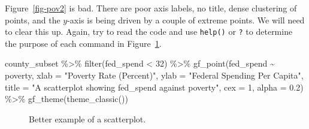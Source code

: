 \documentclass[
  letterpaper,
  DIV=11,
  numbers=noendperiod]{scrreprt}
\newenvironment{Shaded}{\begin{snugshade}}{\end{snugshade}}
\newcommand{\AttributeTok}[1]{\textcolor[rgb]{0.40,0.45,0.13}{#1}}
\newcommand{\DecValTok}[1]{\textcolor[rgb]{0.68,0.00,0.00}{#1}}
\newcommand{\FloatTok}[1]{\textcolor[rgb]{0.68,0.00,0.00}{#1}}
\newcommand{\FunctionTok}[1]{\textcolor[rgb]{0.28,0.35,0.67}{#1}}
\newcommand{\NormalTok}[1]{\textcolor[rgb]{0.00,0.23,0.31}{#1}}
\newcommand{\SpecialCharTok}[1]{\textcolor[rgb]{0.37,0.37,0.37}{#1}}
\newcommand{\StringTok}[1]{\textcolor[rgb]{0.13,0.47,0.30}{#1}}
\begin{document}
Figure~\ref{fig-pov2} is bad. There are poor axis labels, no title,
dense clustering of points, and the \(y\)-axis is being driven by a
couple of extreme points. We will need to clear this up. Again, try to
read the code and use \texttt{help()} or \texttt{?} to determine the
purpose of each command in Figure~\ref{fig-pov3}.

\begin{Shaded}
\begin{Highlighting}[]
\NormalTok{county\_subset }\SpecialCharTok{\%\textgreater{}\%}
  \FunctionTok{filter}\NormalTok{(fed\_spend }\SpecialCharTok{\textless{}} \DecValTok{32}\NormalTok{) }\SpecialCharTok{\%\textgreater{}\%}
  \FunctionTok{gf\_point}\NormalTok{(fed\_spend }\SpecialCharTok{\textasciitilde{}}\NormalTok{ poverty,}
           \AttributeTok{xlab =} \StringTok{"Poverty Rate (Percent)"}\NormalTok{, }
           \AttributeTok{ylab =} \StringTok{"Federal Spending Per Capita"}\NormalTok{,}
           \AttributeTok{title =} \StringTok{"A scatterplot showing fed\_spend against poverty"}\NormalTok{, }
           \AttributeTok{cex =} \DecValTok{1}\NormalTok{, }\AttributeTok{alpha =} \FloatTok{0.2}\NormalTok{) }\SpecialCharTok{\%\textgreater{}\%}
  \FunctionTok{gf\_theme}\NormalTok{(}\FunctionTok{theme\_classic}\NormalTok{())}
\end{Highlighting}
\end{Shaded}

\begin{figure}[H]


\caption{\label{fig-pov3}Better example of a scatterplot.}

\end{figure}%
\end{document}
